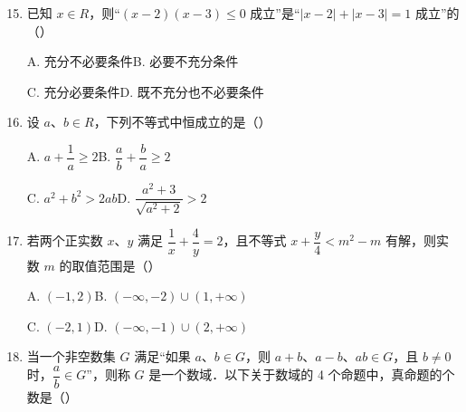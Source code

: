 \documentclass[a4paper,11pt]{article}
\begin{document}
\begin{enumerate}
\setcounter{enumi}{14}

\item 已知 $x\in R$，则“$(x-2)(x-3)\leqslant0$ 成立”是“$\lvert x-2\rvert+\lvert x-3\rvert=1$ 成立”的\mbox{（\quad）}

\keepwithprev
A. 充分不必要条件\qquad B. 必要不充分条件

C. 充分必要条件\qquad D. 既不充分也不必要条件

\ifanswer
\solbegin
{}
\solend
\fi

\item 设 $a$、$b\in R$，下列不等式中恒成立的是\mbox{（\quad）}

\keepwithprev
A. $a+\dfrac1a\geqslant2$\qquad B. $\dfrac ab+\dfrac ba\geqslant2$

C. $a^2+b^2>2ab$\qquad D. $\dfrac{a^2+3}{\sqrt{a^2+2}}>2$

\ifanswer
\solbegin
{}
\solend
\fi

\item 若两个正实数 $x$、$y$ 满足 $\dfrac1x+\dfrac4y=2$，且不等式 $x+\dfrac y4<m^2-m$ 有解，则实数 $m$ 的取值范围是\mbox{（\quad）}

\keepwithprev
A. $(-1,2)$\qquad B. $(-\infty,-2)\cup(1,+\infty)$

C. $(-2,1)$\qquad D. $(-\infty,-1)\cup(2,+\infty)$

\ifanswer
\solbegin
{}%
\solend
\fi

\item 当一个非空数集 $G$ 满足“如果 $a$、$b\in G$，则 $a+b$、$a-b$、$ab\in G$，且 $b\neq0$ 时，$\dfrac ab\in G$”，则称 $G$ 是一个数域．以下关于数域的 4 个命题中，真命题的个数是\mbox{（\quad）}


\end{enumerate}
\end{document}
